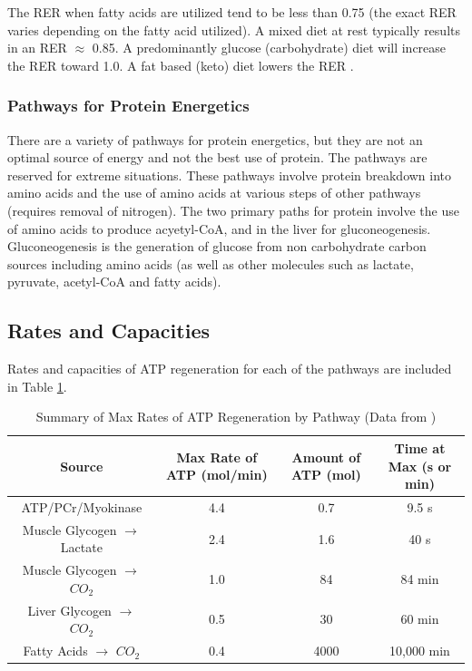 The RER when fatty acids are utilized tend to be less than 0.75 (the exact RER varies depending on the fatty acid utilized). A mixed diet at rest typically results in an RER $\approx$ 0.85. A predominantly glucose (carbohydrate) diet will increase the RER toward 1.0. A fat based (keto) diet lowers the RER \cite{alessandro_effects_2015}.

\subsubsection{Pathways for Protein Energetics}

There are a variety of pathways for protein energetics, but they are not an optimal source of energy and not the best use of protein. The pathways are reserved for extreme situations. These pathways involve protein breakdown into amino acids and the use of amino acids at various steps of other pathways (requires removal of nitrogen). The two primary paths for protein involve the use of amino acids to produce acyetyl-CoA, and in the liver for gluconeogenesis. Gluconeogenesis is the generation of glucose from non carbohydrate carbon sources including amino acids (as well as other molecules such as lactate, pyruvate, acetyl-CoA and fatty acids).


\subsection{Rates and Capacities}

Rates and capacities of ATP regeneration for each of the pathways are included in Table \ref{table:ATP_Rates}.

\begin{table}[h!]
\centering
\begin{tabular}{||c c c c||} 
 \hline
Source & Max Rate of ATP (mol/min) & Amount of ATP (mol) & Time at Max (s or min)\\ [0.5ex] 
 \hline\hline
 ATP/PCr/Myokinase & 4.4  & 0.7 & 9.5 s \\
 Muscle Glycogen $\rightarrow$ Lactate &  2.4 & 1.6 & 40 s \\ 
 Muscle Glycogen $\rightarrow$ $CO_2$ & 1.0 & 84 & 84 min\\
 Liver Glycogen $\rightarrow$ $CO_2$  & 0.5 & 30 & 60 min \\ 
 Fatty Acids $\rightarrow$ $CO_2$ & 0.4 & 4000 & 10,000 min \\[1ex] 
 \hline
\end{tabular}
\caption{Summary of Max Rates of ATP Regeneration by Pathway (\footnotesize{Data from \cite{feher_quantitative_2017}})}
\label{table:ATP_Rates}
\end{table}

